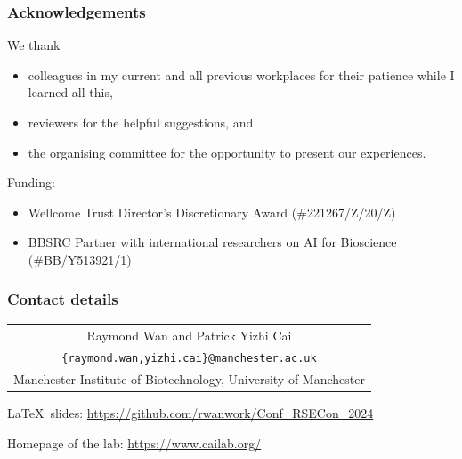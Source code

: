 \documentclass[11pt,aspectratio=43,ignorenonframetext,t]{beamer}
\begin{document}
\begin{frame}

\frametitle{Acknowledgements}

We thank
\begin{itemize}
  \item colleagues in my current and all previous workplaces for their patience while I learned all this,
  \item reviewers for the helpful suggestions, and
  \item the organising committee for the opportunity to present our experiences.
\end{itemize}
\vs

Funding:
\begin{itemize}
  \item Wellcome Trust Director’s Discretionary Award (\#221267/Z/20/Z)
  \item BBSRC Partner with international researchers on AI for Bioscience (\#BB/Y513921/1)
\end{itemize}

\end{frame}


\begin{frame}

\frametitle{Contact details}

\begin{table}
  \begin{tabular}{c}
  Raymond Wan and Patrick Yizhi Cai\\
  {\texttt{\{raymond.wan,yizhi.cai\}@manchester.ac.uk}}\\
  Manchester Institute of Biotechnology, University of Manchester\\
  \end{tabular}
\end{table}
\vs

\LaTeX\ slides:  \href{https://github.com/rwanwork/Conf_RSECon_2024}{https://github.com/rwanwork/Conf\_RSECon\_2024}
\vs

Homepage of the lab:  \href{https://www.cailab.org/}{https://www.cailab.org/}
\vs

\begin{center}
  {}
\end{center}

\end{frame}
\end{document}
